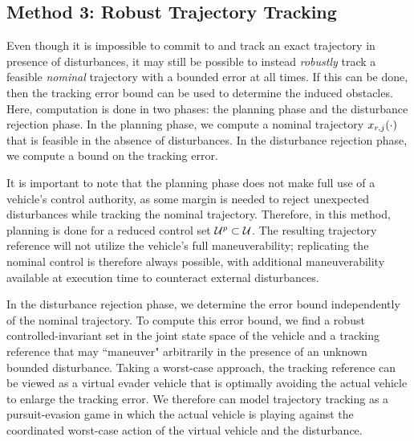 \subsection{Method 3: Robust Trajectory Tracking \label{sec:rtt}}


Even though it is impossible to commit to and track an exact trajectory in presence of disturbances, it may still be possible to instead \textit{robustly} track a feasible \textit{nominal} trajectory with a bounded error at all times. If this can be done, then the tracking error bound can be used to determine the induced obstacles. Here, computation is done in two phases: the planning phase and the disturbance rejection phase. In the planning phase, we compute a nominal trajectory $x_{r,j}(\cdot)$ that is feasible in the absence of disturbances. In the disturbance rejection phase, we compute a bound on the tracking error.%

It is important to note that the planning phase does not make full use of a vehicle's control authority, as some margin is needed to reject unexpected disturbances while tracking the nominal trajectory. Therefore, in this method, planning is done for a reduced control set $\mathcal{U}^p\subset\mathcal{U}$. The resulting trajectory reference will not utilize the vehicle's full maneuverability; replicating the nominal control is therefore always possible, with additional maneuverability available at execution time to counteract external disturbances.

In the disturbance rejection phase, we determine the error bound independently of the nominal trajectory. To compute this error bound, we find a robust controlled-invariant set in the joint state space of the vehicle and a tracking reference that may ``maneuver" arbitrarily in the presence of an unknown bounded disturbance. Taking a worst-case approach, the tracking reference can be viewed as a virtual evader vehicle that is optimally avoiding the actual vehicle to enlarge the tracking error. We therefore can model trajectory tracking as a pursuit-evasion game in which the actual vehicle is playing against the coordinated worst-case action of the virtual vehicle and the disturbance. %

